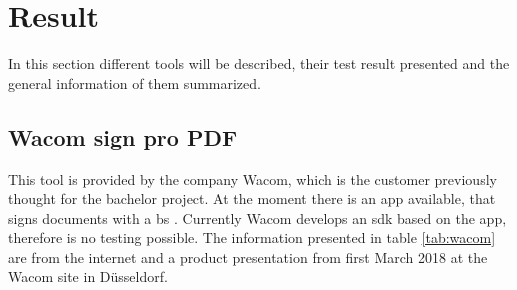 \section{Result}
In this section different tools will be described, their test result presented and the general information of them summarized.

\subsection{Wacom sign pro PDF}
This tool is provided by the company Wacom, which is the customer previously thought for the bachelor project. At the moment there is an \gls{app} available, that signs documents with a \gls{bs} \parencite{wacom2018pdf}. Currently Wacom develops an \gls{sdk} based on the \gls{app}, therefore is no testing possible. The information presented in table \ref{tab:wacom} are from the internet and a product presentation from first March 2018 at the Wacom site in Düsseldorf. \newline
